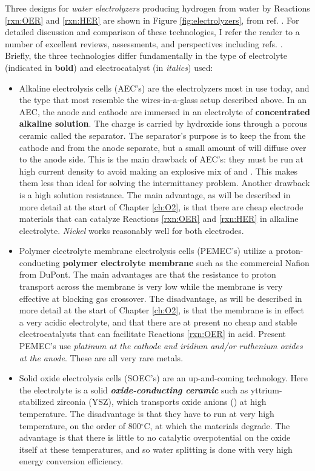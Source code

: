 Three designs for \textit{water electrolyzers} producing hydrogen from water by Reactions \ref{rxn:OER} and \ref{rxn:HER} are shown in Figure \ref{fig:electrolyzers}, from ref. . For detailed discussion and comparison of these technologies, I refer the reader to a number of excellent reviews, assessments, and perspectives including refs. . Briefly, the three technologies differ fundamentally in the type of electrolyte (indicated in \textbf{bold}) and electrocatalyst (in \textit{italics}) used: 

\begin{itemize}
\item Alkaline electrolysis cells (AEC's) are the electrolyzers most in use today, and the type that most resemble the wires-in-a-glass setup described above. In an AEC, the anode and cathode are immersed in an electrolyte of \textbf{concentrated alkaline solution}. The charge is carried by hydroxide ions through a porous ceramic called the separator. The separator's purpose is to keep the  from the cathode and  from the anode separate, but a small amount of  will diffuse over to the anode side. This is the main drawback of AEC's: they must be run at high current density to avoid making an explosive mix of  and . This makes them less than ideal for solving the intermittancy problem. Another drawback is a high solution resistance. The main advantage, as will be described in more detail at the start of Chapter \ref{ch:O2}, is that there are cheap electrode materials that can catalyze Reactions \ref{rxn:OER} and \ref{rxn:HER} in alkaline electrolyte. \textit{Nickel} works reasonably well for both electrodes.

\item Polymer electrolyte membrane electrolysis cells (PEMEC's) utilize a proton-conducting \textbf{polymer electrolyte membrane} such as the commercial Nafion from DuPont. The main advantages are that the resistance to proton transport across the membrane is very low while the membrane is very effective at blocking gas crossover. The disadvantage, as will be described in more detail at the start of Chapter \ref{ch:O2}, is that the membrane is in effect a very acidic electrolyte, and that there are at present no cheap and stable electrocatalysts that can facilitate Reactions \ref{rxn:OER} in acid. Present PEMEC's use \textit{platinum at the cathode and iridium and/or ruthenium oxides at the anode}. These are all very rare metals.

\item Solid oxide electrolysis cells (SOEC's) are an up-and-coming technology. Here the electrolyte is a solid \textit{\textbf{oxide-conducting ceramic}} such as yttrium-stabilized zirconia (YSZ), which transports oxide anions () at high temperature. The disadvantage is that they have to run at very high temperature, on the order of 800$^\circ$C, at which the materials degrade. The advantage is that there is little to no catalytic overpotential on the oxide itself at these temperatures, and so water splitting is done with very high energy conversion efficiency.
\end{itemize}

